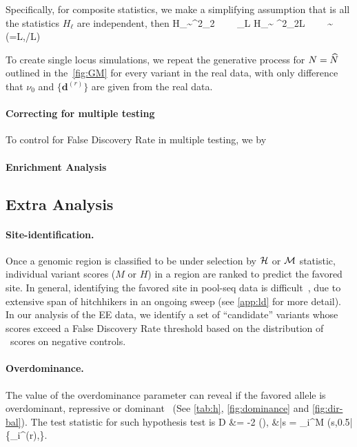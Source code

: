Specifically, for composite statistics, we make a simplifying assumption that 
is all the statistics ${H_\ell}$ are independent, then
\beq
H_\ell \sim \Xc^2_2 \ \ \Longrightarrow \ \ \sum_{\ell \in L} H_\ell \sim 
\Xc^2_{2L}
\ \ \Longleftrightarrow \ \ \Hc \sim {}(\alpha=L,/L)
\eeq

To create single  locus simulations, we repeat the generative process for 
$N=\widehat{N}$ outlined 
in the~\ref{fig:GM} for every variant in the real data, with only difference that 
$\nu_0$ and $\{\bm d^{(r)}\}$ are given from the real data.
\paragraph{Correcting for multiple testing}
To control for False Discovery Rate in multiple testing, we by

\paragraph{Enrichment Analysis}

\subsection{Extra Analysis}

\paragraph{Site-identification.} 
Once a genomic region is classified to be under selection by ${\cal H}$ or ${\cal M}$ 
statistic,
individual variant scores ($M$ or $H$) in a region are ranked to predict the
favored site. In general, identifying the favored site in pool-seq
data is difficult~\cite{tobler2014massive}, due to extensive span of
hitchhikers in an ongoing sweep (see \ref{app:ld} for 
more
detail). In our analysis of the \dmel EE data, we identify a set of
``candidate'' variants whose scores exceed a False Discovery Rate
threshold based on the distribution of \comale\ scores on negative
controls.

\paragraph{Overdominance.}
\label{sec:regression}
 The value of the overdominance 
 parameter can
reveal if the favored allele
is overdominant, repressive or dominant~\cite{gillespie2010population} 
 (See \ref{tab:h}, \ref{fig:dominance} and \ref{fig:dir-bal}). The test statistic for 
 such hypothesis test is
\beq
D &= -2 \log 
\left(\right),
&\bar{s} =  \prod_i^M 
\Lc(s,0.5|\{_i^{(r)},\hN\}.
\eeq

